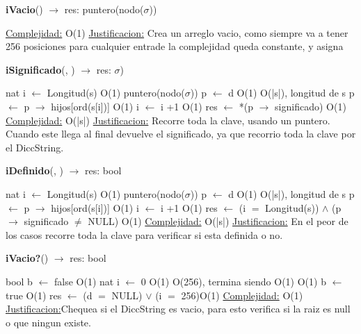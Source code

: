 \begin{Representacion}
\begin{Algoritmos}
\begin{algorithm}[H]{\textbf{iVacio}() $\to$ res: puntero(nodo($\sigma$))}
\begin{algorithmic}[1]
		\medskip
		\Statex \underline{Complejidad:} O(1)
			\Statex \underline{Justificacion:} Crea un arreglo vacio, como siempre va a tener 256 posiciones para cualquier entrade la complejidad queda constante, y asigna 
	\end{algorithmic}
\end{algorithm}


\begin{algorithm}[H]{\textbf{iSignificado}(, ) $\to$ res: $\sigma$)}
	\begin{algorithmic}[1]
		\State nat i $\gets$ Longitud(s) \Comment O(1)
		\State puntero(nodo($\sigma$)) p $\gets$ d \Comment O(1)
		 \Comment O(|s|), longitud de s
			\State p $\gets$ p $\to$ hijos[ord(s[i])] \Comment O(1)
		 	\State i $\gets$ i +1 \Comment O(1)
		 \EndWhile
		 \State res $\gets$ *(p $\to$ significado) \Comment O(1)
		\medskip
		\Statex \underline{Complejidad:} O(|s|)
			\Statex \underline{Justificacion:} Recorre toda la clave, usando un puntero. Cuando este llega al final devuelve el significado, ya que recorrio toda la clave por el DiccString.  
	\end{algorithmic}
\end{algorithm}

\begin{algorithm}[H]{\textbf{iDefinido}(, ) $\to$ res: bool}
	\begin{algorithmic}[1]
		\State nat i $\gets$ Longitud(s) \Comment O(1)
		\State puntero(nodo($\sigma$)) p $\gets$ d \Comment O(1)
		 \Comment O(|s|), longitud de s
			\State p $\gets$ p $\to$ hijos[ord(s[i])] \Comment O(1)
		 	\State i $\gets$ i +1 \Comment O(1)
		 \EndWhile
		 \State res $\gets$ (i $=$ Longitud(s)) $\wedge$ (p$\to$ significado $\neq$ NULL) \Comment O(1)
		\medskip
		\Statex \underline{Complejidad:} O(|s|)
			\Statex \underline{Justificacion:} En el peor de los casos recorre toda la clave para verificar si esta definida o no.  
	\end{algorithmic}
\end{algorithm}

\begin{algorithm}[H]{\textbf{iVacio?}() $\to$ res: bool}
	\begin{algorithmic}[1]
		\State bool b $\gets$ false \Comment O(1)
		\State nat i $\gets$ 0 \Comment O(1)
		 \Comment O(256), termina siendo O(1)
			 \Comment O(1)
				 b $\gets$ true \Comment O(1)
			\EndIf
		\EndWhile
		\State res $\gets$ (d $=$ NULL) $\vee$ (i $=$ 256)\Comment O(1)
		\medskip
		\Statex \underline{Complejidad:} O(1)
			\Statex \underline{Justificacion:}Chequea si el DiccString es vacio, para esto verifica si la raiz es null o que ningun existe.
	\end{algorithmic}
\end{algorithm}


\end{Algoritmos}
\end{Representacion}

